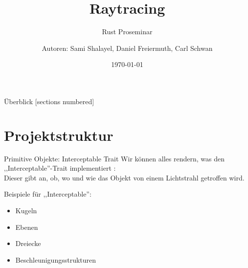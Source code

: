 \documentclass[aspectratio=169]{beamer}
\title{Raytracing}
\subtitle{Rust Proseminar}
\author[Sami Shalayel, Daniel Freiermuth, Carl Schwan]{%
    Autoren: Sami Shalayel, Daniel Freiermuth, Carl Schwan}
\institute{Universität des Saarlandes}
\date{\today}
\begin{document}
\maketitle

\begin{frame}{Überblick}
    [sections numbered]
    \tableofcontents[hideallsubsections]
\end{frame}

\section{Projektstruktur}
\begin{frame}[fragile]{Primitive Objekte: Interceptable Trait}
    Wir können alles rendern, was den ,,Interceptable''-Trait implementiert : \\

    Dieser gibt an, ob, wo und wie das Objekt von einem Lichtstrahl getroffen wird.

    \pause
    Beispiele für ,,Interceptable'':
    \begin{itemize}[<+->]
        \item Kugeln
        \item Ebenen
        \item Dreiecke
        \item Beschleunigungsstrukturen
    \end{itemize}

\end{frame}
\end{document}
